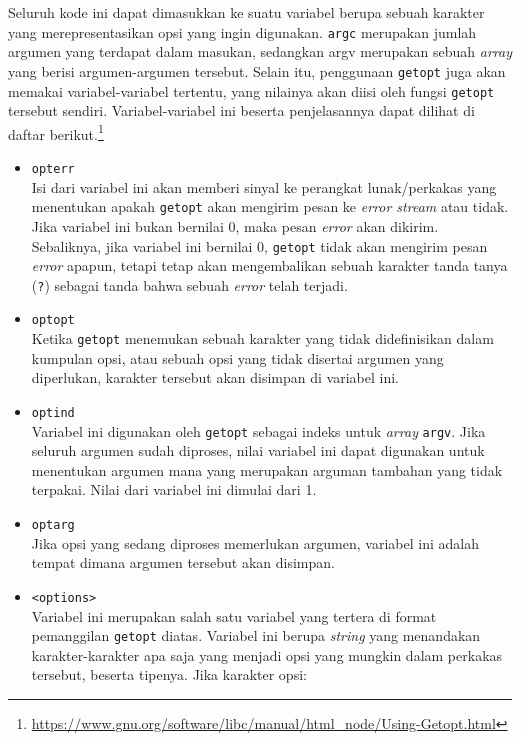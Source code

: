\documentclass[a4paper,twoside]{article}
\begin{document}
\begin{enumerate}
Seluruh kode ini dapat dimasukkan ke suatu variabel berupa sebuah karakter yang merepresentasikan opsi yang ingin digunakan. \verb|argc| merupakan jumlah argumen yang terdapat dalam masukan, sedangkan argv merupakan sebuah \textit{array} yang berisi argumen-argumen tersebut.
\newline\newline
Selain itu, penggunaan \verb|getopt| juga akan memakai variabel-variabel tertentu, yang nilainya akan diisi oleh fungsi \verb|getopt| tersebut sendiri. Variabel-variabel ini beserta penjelasannya dapat dilihat di daftar berikut.\footnote{\href{https://www.gnu.org/software/libc/manual/html\_node/Using-Getopt.html}{https://www.gnu.org/software/libc/manual/html\_node/Using-Getopt.html}}
\begin{itemize}
	\item \verb|opterr|\\
	Isi dari variabel ini akan memberi sinyal ke perangkat lunak/perkakas yang menentukan apakah \verb|getopt| akan mengirim pesan ke \textit{error stream} atau tidak. Jika variabel ini bukan bernilai 0, maka pesan \textit{error} akan dikirim. Sebaliknya, jika variabel ini bernilai 0, \verb|getopt| tidak akan mengirim pesan \textit{error} apapun, tetapi tetap akan mengembalikan sebuah karakter tanda tanya (\verb|?|) sebagai tanda bahwa sebuah \textit{error} telah terjadi.
	\item \verb|optopt|\\
	Ketika \verb|getopt| menemukan sebuah karakter yang tidak didefinisikan dalam kumpulan opsi, atau sebuah opsi yang tidak disertai argumen yang diperlukan, karakter tersebut akan disimpan di variabel ini.
	\item \verb|optind|\\
	Variabel ini digunakan oleh \verb|getopt| sebagai indeks untuk \textit{array} \verb|argv|. Jika seluruh argumen sudah diproses, nilai variabel ini dapat digunakan untuk menentukan argumen mana yang merupakan arguman tambahan yang tidak terpakai. Nilai dari variabel ini dimulai dari 1.
	\item \verb|optarg|\\
	Jika opsi yang sedang diproses memerlukan argumen, variabel ini adalah tempat dimana argumen tersebut akan disimpan.
	\item \verb|<options>|\\
	Variabel ini merupakan salah satu variabel yang tertera di format pemanggilan \verb|getopt| diatas. Variabel ini berupa \textit{string} yang menandakan karakter-karakter apa saja yang menjadi opsi yang mungkin dalam perkakas tersebut, beserta tipenya. Jika karakter opsi:
	

\end{itemize}
\end{enumerate}
\end{document}
